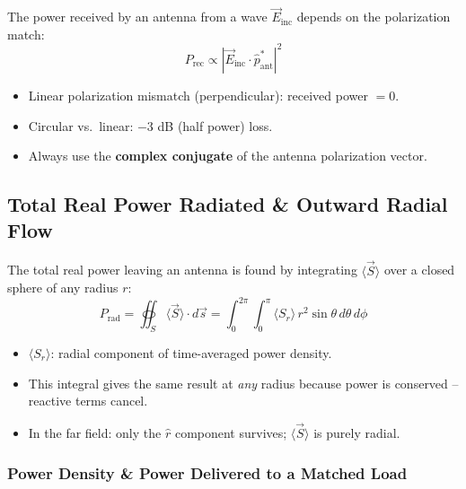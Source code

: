 \documentclass[10pt,letterpaper]{article}
\newcommand{\vE}{\vec{E}}
\begin{document}
\begin{tcolorbox}[keybox, title={Polarization \& Power Reception}]
The power received by an antenna from a wave $\vE_\mathrm{inc}$ depends on the polarization match:
\begin{equation}
  P_\mathrm{rec} \propto \left|\vE_\mathrm{inc}\cdot\hat{p}_\mathrm{ant}^*\right|^2
\end{equation}
\begin{itemize}[noitemsep]
  \item Linear polarization mismatch (perpendicular): received power $= 0$.
  \item Circular vs.\ linear: $-3$ dB (half power) loss.
  \item Always use the \textbf{complex conjugate} of the antenna polarization vector.
\end{itemize}
\end{tcolorbox}

\subsection{Total Real Power Radiated \& Outward Radial Flow}

\begin{tcolorbox}[formulabox, title={Total Radiated Power}]
The total real power leaving an antenna is found by integrating $\langle\vec{S}\rangle$ over a closed sphere of any radius $r$:
\begin{equation}
  P_\mathrm{rad} = \oiint_S \langle\vec{S}\rangle\cdot d\vec{s} = \int_0^{2\pi}\!\int_0^{\pi} \langle S_r\rangle\, r^2\sin\theta\,d\theta\,d\phi
\end{equation}
\begin{itemize}[noitemsep]
  \item $\langle S_r\rangle$: radial component of time-averaged power density.
  \item This integral gives the same result at \emph{any} radius because power is conserved -- reactive terms cancel.
  \item In the far field: only the $\hat{r}$ component survives; $\langle\vec{S}\rangle$ is purely radial.
\end{itemize}
\end{tcolorbox}

\subsubsection{Power Density \& Power Delivered to a Matched Load}
\end{document}
